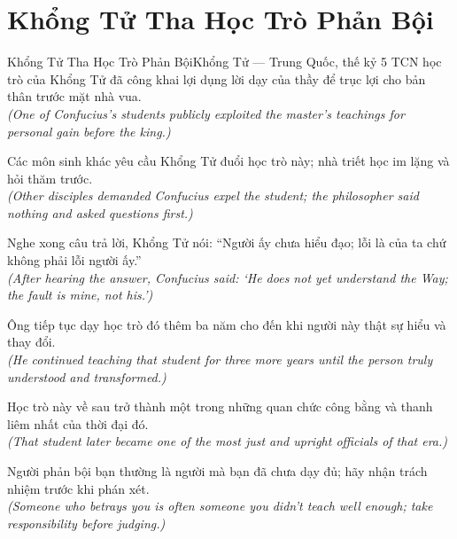 \section{Khổng Tử Tha Học Trò Phản Bội}
\begin{truyen}{Khổng Tử Tha Học Trò Phản Bội}{Khổng Tử --- Trung Quốc, thế kỷ 5 TCN}
 học trò của Khổng Tử đã công khai lợi dụng lời dạy của thầy để trục lợi cho bản thân trước mặt nhà vua.\\[4pt]
\textit{(One of Confucius's students publicly exploited the master's teachings for personal gain before the king.)}

Các môn sinh khác yêu cầu Khổng Tử đuổi học trò này; nhà triết học im lặng và hỏi thăm trước.\\[4pt]
\textit{(Other disciples demanded Confucius expel the student; the philosopher said nothing and asked questions first.)}

Nghe xong câu trả lời, Khổng Tử nói: ``Người ấy chưa hiểu đạo; lỗi là của ta chứ không phải lỗi người ấy.''\\[4pt]
\textit{(After hearing the answer, Confucius said: `He does not yet understand the Way; the fault is mine, not his.')}

Ông tiếp tục dạy học trò đó thêm ba năm cho đến khi người này thật sự hiểu và thay đổi.\\[4pt]
\textit{(He continued teaching that student for three more years until the person truly understood and transformed.)}

Học trò này về sau trở thành một trong những quan chức công bằng và thanh liêm nhất của thời đại đó.\\[4pt]
\textit{(That student later became one of the most just and upright officials of that era.)}

\end{truyen}
\begin{baihoc}
  Người phản bội bạn thường là người mà bạn đã chưa dạy đủ; hãy nhận trách nhiệm trước khi phán xét.\\[4pt]
  \textit{(Someone who betrays you is often someone you didn't teach well enough; take responsibility before judging.)}
\end{baihoc}

